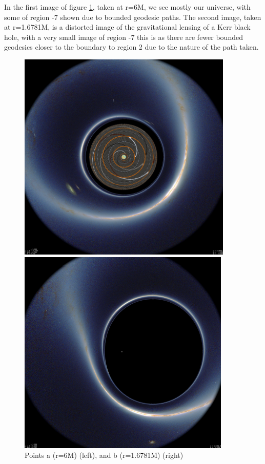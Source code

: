 \documentclass[oneside,openright,frontopenright, singlespacing]{dmathesis}
\begin{document}
\vspace{1em}
	In the first image of figure \ref{fig:Figure6.3}, taken at r=6M, we see mostly our universe, with some of region -7 shown due to bounded geodesic paths. The second image, taken at r=1.6781M, is a distorted image of the gravitational lensing of a Kerr black hole, with a very small image of region -7 this is as there are fewer bounded geodesics closer to the boundary to region 2 due to the nature of the path taken. 

\vspace{1em}
\begin{figure}[!ht]
	\centering
	\begin{minipage}{0.5\textwidth}
		\centering
		\includegraphics[width=0.7\linewidth]{img/plunging1}
	\end{minipage}%
	\hfill
	\begin{minipage}{0.5\textwidth}
		\centering
		\includegraphics[width=0.7\linewidth]{img/plunging2}
	\end{minipage}
	\caption{Points a (r=6M) (left), and b (r=1.6781M) (right)}
	\label{fig:Figure6.3}
\end{figure}
\end{document}
